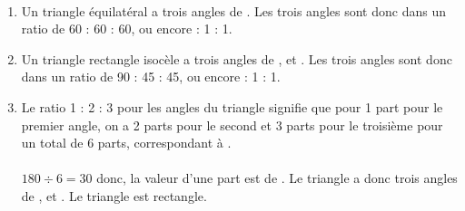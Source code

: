\ \\ [-5mm]
   \begin{enumerate}
      \item Un triangle équilatéral a trois angles de . Les trois angles sont donc dans un ratio de 60 : 60 : 60, ou encore { : 1 : 1}.
      \item Un triangle rectangle isocèle a trois angles de ,  et . Les trois angles sont donc dans un ratio de 90 : 45 : 45, ou encore { : 1 : 1}.
      \item Le ratio 1 : 2 : 3 pour les angles du triangle signifie que pour 1 part pour le premier angle, on a 2 parts pour le second et 3 parts pour le troisième pour un total de 6 parts, correspondant à . \\ [2mm]
            \quad {} \\
         $180\div6 =30$ donc, la valeur d'une part est de . Le triangle a donc trois angles de ,  et .
         {\blue Le triangle est rectangle.}
   \end{enumerate}
